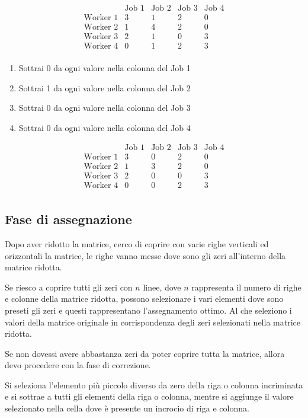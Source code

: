 \[
\begin{array}{c|cccc}
      & \text{Job 1} & \text{Job 2} & \text{Job 3} & \text{Job 4} \\
\hline
\text{Worker 1} & 3 & 1 & 2 & 0 \\
\text{Worker 2} & 1 & 4 & 2 & 0 \\
\text{Worker 3} & 2 & 1 & 0 & 3 \\
\text{Worker 4} & 0 & 1 & 2 & 3 \\
\end{array}
\]

\begin{enumerate}
   \item Sottrai 0 da ogni valore nella colonna del Job 1
   \item Sottrai 1 da ogni valore nella colonna del Job 2
   \item Sottrai 0 da ogni valore nella colonna del Job 3
   \item Sottrai 0 da ogni valore nella colonna del Job 4
\end{enumerate}

\[
\begin{array}{c|cccc}
      & \text{Job 1} & \text{Job 2} & \text{Job 3} & \text{Job 4} \\
\hline
\text{Worker 1} & 3 & 0 & 2 & 0 \\
\text{Worker 2} & 1 & 3 & 2 & 0 \\
\text{Worker 3} & 2 & 0 & 0 & 3 \\
\text{Worker 4} & 0 & 0 & 2 & 3 \\
\end{array}
\]

\subsection{Fase di assegnazione}
Dopo aver ridotto la matrice, cerco di coprire con varie righe verticali ed orizzontali la matrice, le righe vanno messe dove sono gli zeri all'interno della matrice ridotta.


Se riesco a coprire tutti gli zeri con $n$ linee, dove $n$ rappresenta il numero di righe e colonne della matrice ridotta, possono selezionare i vari elementi dove sono preseti gli zeri e questi rappresentano l'assegnamento ottimo.
Al che seleziono i valori della matrice originale in corrispondenza degli zeri selezionati nella matrice ridotta.


Se non dovessi avere abbastanza zeri da poter coprire tutta la matrice, allora devo procedere con la fase di correzione.

Si seleziona l'elemento pi\`u piccolo diverso da zero della riga o colonna incriminata e si sottrae a tutti gli elementi della riga o colonna, mentre si aggiunge il valore selezionato nella cella dove \`e presente un incrocio di riga e colonna.



